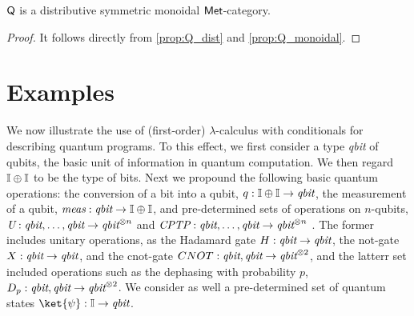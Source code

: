\begin{theorem}
  $\mathsf{Q}$ is a distributive symmetric monoidal $\mathsf{Met}$-category. 
\end{theorem}

\begin{proof}
  It follows directly from \autoref{prop:Q_dist} and  \autoref{prop:Q_monoidal}.
\end{proof}











\section{Examples}

We now illustrate the use of (first-order) $\lambda$-calculus with conditionals for describing quantum
programs. To this effect, we first consider a type \emph{qbit} of qubits, the
basic unit of information in quantum computation. We then regard $\mathbb{I} \oplus
\mathbb{I}$ to be the type of bits. Next we propound the following
basic quantum operations:  the conversion of a bit into a qubit, $q : \mathbb{I}
\oplus \mathbb{I}  \to \emph{qbit}$, the measurement of a qubit,
$\emph{meas}:\emph{qbit} \to \mathbb{I} \oplus \mathbb{I}$, and pre-determined sets of
operations on $n$-qubits, $\emph{U}:\emph{qbit},\ldots,\emph{qbit} \to
\emph{qbit}^{\otimes n}$ and $\emph{CPTP}:\emph{qbit},\ldots,\emph{qbit} \to
\emph{qbit}^{\otimes n}$ . The former includes unitary operations, as the Hadamard
gate $H : \emph{qbit} \to \emph{qbit}$, the not-gate $X : \emph{qbit} \to
\emph{qbit}$, and the cnot-gate $CNOT : \emph{qbit},\emph{qbit} \to
\emph{qbit}^{\otimes 2}$, and the  latterr set included operations such as the dephasing with probability $p$, $D_p : \emph{qbit},\emph{qbit} \to
\emph{qbit}^{\otimes 2}$. We consider as well a pre-determined set of quantum
states $\ket{\psi} : \typeI \to \emph{qbit}$.  

